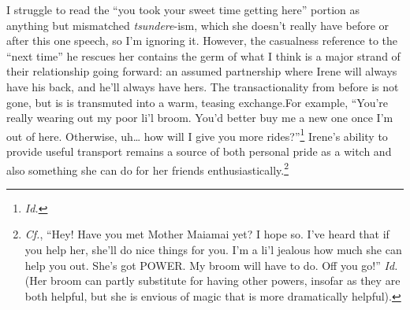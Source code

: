   I struggle to read the ``you took your sweet time getting here'' portion as anything but mismatched \emph{tsundere}-ism, which she doesn't really have before or after this one speech, so I'm ignoring it. However, the casualness reference to the ``next time'' he rescues her contains the germ of what I think is a major strand of their relationship going forward: an assumed partnership where Irene will always have his back, and he'll always have hers. The transactionality from before is not gone, but is is transmuted into a warm, teasing exchange.For example, ``You’re really wearing out my poor li’l broom. You’d better buy me a new one once I’m out of here. Otherwise, uh\ldots{} how will I give you more rides?''\footnote{\textit{Id.}} Irene's ability to provide useful transport remains a source of both personal pride as a witch and also something she can do for her friends enthusiastically.\footnote{\textit{Cf.}, ``Hey! Have you met Mother Maiamai yet? I hope so. I’ve heard that if you help her, she’ll do nice things for you. I’m a li’l jealous how much she can help you out. She’s got POWER. My broom will have to do. Off you go!'' \textit{Id.} (Her broom can partly substitute for having other powers, insofar as they are both helpful, but she is envious of magic that is more dramatically helpful).}
  
